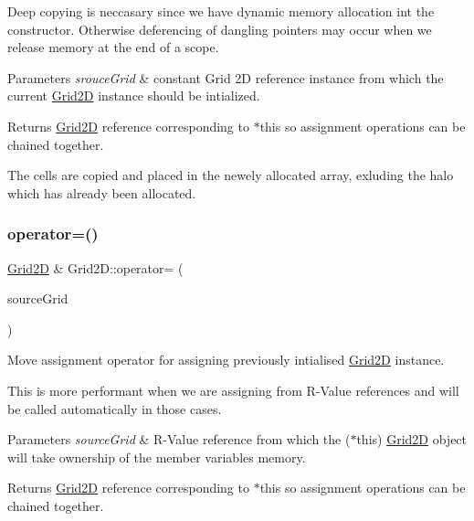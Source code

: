 Deep copying is neccasary since we have dynamic memory allocation int the constructor. Otherwise deferencing of dangling pointers may occur when we release memory at the end of a scope.


\begin{DoxyParams}{Parameters}
{\em srouce\+Grid} & constant Grid 2D reference instance from which the current \hyperlink{class_grid2_d}{Grid2D} instance should be intialized.\\
\hline
\end{DoxyParams}
\begin{DoxyReturn}{Returns}
\hyperlink{class_grid2_d}{Grid2D} reference corresponding to $\ast$this so assignment operations can be chained together. 
\end{DoxyReturn}
The cells are copied and placed in the newely allocated array, exluding the halo which has already been allocated. \mbox{\label{class_grid2_d_a1191e358bbda72eb01035d7284a4982f}} 
\subsubsection{\texorpdfstring{operator=()}{operator=()}\hspace{0.1cm}{\footnotesize\ttfamily [2/2]}}
{\footnotesize\ttfamily \hyperlink{class_grid2_d}{Grid2D} \& Grid2\+D\+::operator= (\begin{DoxyParamCaption}\item[{\hyperlink{class_grid2_d}{Grid2D} \&\&}]{source\+Grid }\end{DoxyParamCaption})}



Move assignment operator for assigning previously intialised \hyperlink{class_grid2_d}{Grid2D} instance. 

This is more performant when we are assigning from R-\/\+Value references and will be called automatically in those cases.


\begin{DoxyParams}{Parameters}
{\em source\+Grid} & R-\/\+Value reference from which the ($\ast$this) \hyperlink{class_grid2_d}{Grid2D} object will take ownership of the member variables memory.\\
\hline
\end{DoxyParams}
\begin{DoxyReturn}{Returns}
\hyperlink{class_grid2_d}{Grid2D} reference corresponding to $\ast$this so assignment operations can be chained together. 
\end{DoxyReturn}
\mbox{\label{class_grid2_d_a01288e0ef6890191f0f907a708c57fbc}} 

